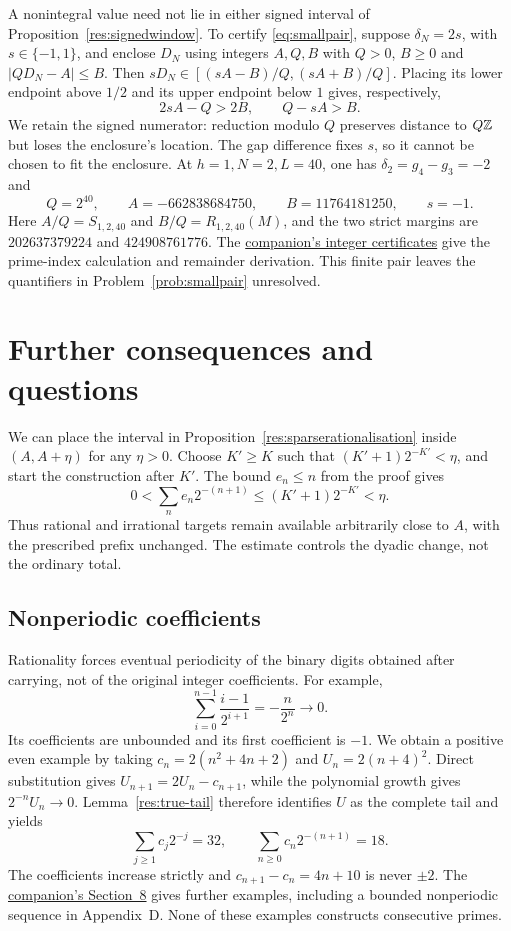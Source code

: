 \documentclass[11pt]{article}
\begin{document}
A nonintegral value need not lie in either signed interval of
Proposition~\ref{res:signedwindow}.  To certify \eqref{eq:smallpair},
suppose $\delta_N=2s$, with $s\in\{-1,1\}$, and enclose $D_N$ using integers
$A,Q,B$ with $Q>0$, $B\ge0$ and $|QD_N-A|\le B$.
Then $sD_N\in[(sA-B)/Q,(sA+B)/Q]$.  Placing its lower endpoint above
$1/2$ and its upper endpoint below $1$ gives, respectively,
\[
 2sA-Q>2B,\qquad Q-sA>B.
\]
We retain the signed numerator: reduction modulo $Q$ preserves
distance to $Q\mathbb{Z}$ but loses the enclosure's location.  The gap
difference fixes $s$, so it cannot be chosen to fit the enclosure.
At $h=1,N=2,L=40$, one has $\delta_2=g_4-g_3=-2$ and
\[
 Q=2^{40},\qquad A=-662838684750,\qquad B=11764181250,\qquad s=-1.
\]
Here $A/Q=S_{1,2,40}$ and $B/Q=R_{1,2,40}(M)$, and the two strict
margins are $202637379224$ and $424908761776$.
The \href{erdos251-prime-gap-reasoning-surface.pdf\#finite-certificates}{companion's integer certificates}
give the prime-index calculation and remainder derivation.  This finite
pair leaves the quantifiers in Problem~\ref{prob:smallpair} unresolved.

\section{Further consequences and questions}\label{sec:open}
We can place the interval in Proposition~\ref{res:sparserationalisation}
inside $(A,A+\eta)$ for any $\eta>0$.  Choose $K'\ge K$ such that
$(K'+1)2^{-K'}<\eta$, and start the construction after $K'$.
The bound $e_n\le n$ from the proof gives
\[
 0<\sum_ne_n2^{-(n+1)}\le(K'+1)2^{-K'}<\eta.
\]
Thus rational and irrational targets remain available arbitrarily close
to $A$, with the prescribed prefix unchanged.  The estimate controls the
dyadic change, not the ordinary total.

\subsection{Nonperiodic coefficients}\label{sec:carry}
Rationality forces eventual periodicity of the binary digits obtained
after carrying, not of the original integer coefficients.  For example,
\[
 \sum_{i=0}^{n-1}\frac{i-1}{2^{i+1}}=-\frac{n}{2^n}\longrightarrow0.
\]
Its coefficients are unbounded and its first coefficient is $-1$.
We obtain a positive even example by taking $c_n=2(n^2+4n+2)$ and
$U_n=2(n+4)^2$.  Direct substitution gives
$U_{n+1}=2U_n-c_{n+1}$, while the polynomial growth gives
$2^{-n}U_n\to0$.  Lemma~\ref{res:true-tail} therefore identifies $U$
as the complete tail and yields
\[
 \sum_{j\ge1}c_j2^{-j}=32,\qquad
 \sum_{n\ge0}c_n2^{-(n+1)}=18.
\]
The coefficients increase strictly and $c_{n+1}-c_n=4n+10$ is never
$\pm2$.  The \href{erdos251-prime-gap-reasoning-surface.pdf\#counterexamples}{companion's Section~8}
gives further examples, including a bounded nonperiodic sequence in
Appendix~D.  None of these examples constructs consecutive primes.
\end{document}
